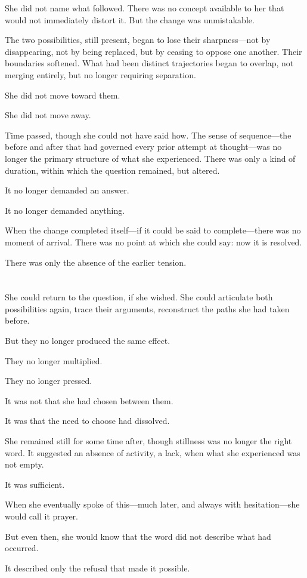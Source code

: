 She did not name what followed. There was no concept available to
her that would not immediately distort it. But the change was
unmistakable.

The two possibilities, still present, began to lose their
sharpness---not by disappearing, not by being replaced, but by
ceasing to oppose one another. Their boundaries softened. What had
been distinct trajectories began to overlap, not merging entirely,
but no longer requiring separation.

She did not move toward them.

She did not move away.

Time passed, though she could not have said how. The sense of
sequence---the before and after that had governed every prior
attempt at thought---was no longer the primary structure of what
she experienced. There was only a kind of duration, within which
the question remained, but altered.

It no longer demanded an answer.

It no longer demanded anything.

When the change completed itself---if it could be said to
complete---there was no moment of arrival. There was no point at
which she could say: now it is resolved.

There was only the absence of the earlier tension.

\section{}

She could return to the question, if she wished. She could
articulate both possibilities again, trace their arguments,
reconstruct the paths she had taken before.

But they no longer produced the same effect.

They no longer multiplied.

They no longer pressed.

It was not that she had chosen between them.

It was that the need to choose had dissolved.

She remained still for some time after, though stillness was no
longer the right word. It suggested an absence of activity, a lack,
when what she experienced was not empty.

It was sufficient.

When she eventually spoke of this---much later, and always with
hesitation---she would call it prayer.

But even then, she would know that the word did not describe what
had occurred.

It described only the refusal that made it possible.
